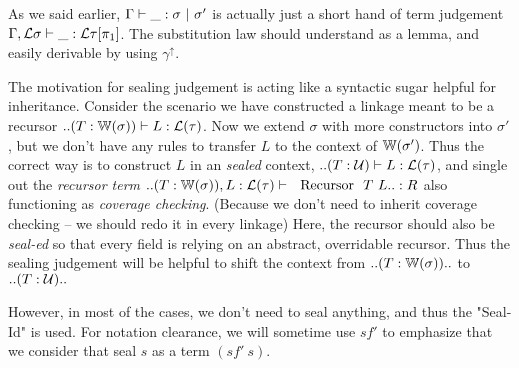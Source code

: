 As we said earlier, ${ {\Gamma} \vdash {\_} : {\sigma} \ |\ {\sigma'} }$ is actually just a short hand of term judgement ${ {\Gamma , {\mathcal{L}} \sigma} \vdash {\_} : {{\mathcal{L}}\tau[\pi_1]} }$. The substitution law should understand as a lemma, and easily derivable by using $\gamma^\uparrow$. 

The motivation for sealing judgement is acting like a syntactic sugar helpful for inheritance. Consider the scenario we have constructed a linkage meant to be a recursor $  .. (T : {\mathbb{W}}(\sigma)) \vdash L : {\mathcal{L}}(\tau)$. Now we extend $\sigma$ with more constructors into $\sigma'$, but we don't have any rules to transfer $L$ to the context of ${\mathbb{W}}(\sigma')$. Thus the correct way is to construct $L$ in an \textit{sealed} context, $  .. (T : {\mathcal{U}}) \vdash L : {\mathcal{L}}(\tau)$, and single out the \textit{recursor term}  $.. (T : \bW(\sigma)), L : \cL(\tau) \vdash \ \text{ Recursor } \ T \ L .. : R $ also functioning as \textit{coverage checking}.
(Because we don't need to inherit coverage checking -- we should redo it in every linkage) Here, the recursor should also be \textit{seal-ed} so that every field is relying on an abstract, overridable recursor.
Thus the sealing judgement will be helpful to shift the context from $.. (T : {\mathbb{W}}(\sigma)) .. $ to $.. (T : {\mathcal{U}}) ..$

However, in most of the cases, we don't need to seal anything, and thus the "Seal-Id" is used. For notation clearance, we will sometime use $sf'$ to emphasize that we consider that seal $s$ as a term $(sf' \ s)$. 


